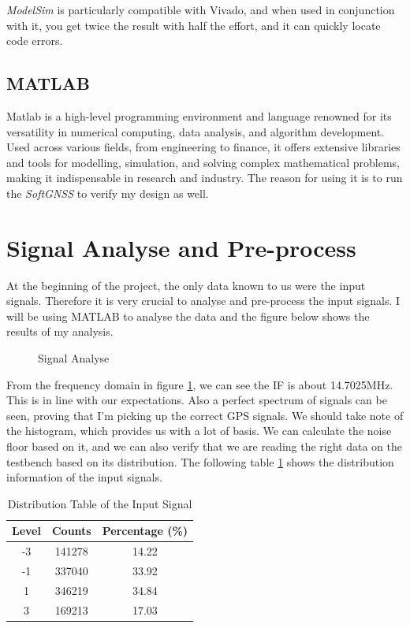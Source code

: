 \textit{ModelSim} is particularly compatible with Vivado, and when used in conjunction with it, you get twice the result with half the effort, and it can quickly locate code errors.

\subsection{MATLAB}
Matlab is a high-level programming environment and language renowned for its versatility in numerical computing, data analysis, and algorithm development. Used across various fields, from engineering to finance, it offers extensive libraries and tools for modelling, simulation, and solving complex mathematical problems, making it indispensable in research and industry. The reason for using it is to run the \textit{SoftGNSS} to verify my design as well.

\section{Signal Analyse and Pre-process}
At the beginning of the project, the only data known to us were the input signals. Therefore it is very crucial to analyse and pre-process the input signals. I will be using MATLAB to analyse the data and the figure below shows the results of my analysis.

\begin{figure}[!htbp]
    \centering
    
    \caption{Signal Analyse}
    \label{fig:sig_info}
\end{figure}

From the frequency domain in figure \ref{fig:sig_info}, we can see the IF is about 14.7025MHz. This is in line with our expectations. Also a perfect spectrum of signals can be seen, proving that I'm picking up the correct GPS signals. We should take note of the histogram, which provides us with a lot of basis. We can calculate the noise floor based on it, and we can also verify that we are reading the right data on the testbench based on its distribution. The following table \ref{tab:dis_sig} shows the distribution information of the input signals.

\begin{table}[!htbp]
\centering
\renewcommand\arraystretch{1.5}
\caption{Distribution Table of the Input Signal}
\label{tab:dis_sig}
\begin{tabular}{ccc}
    \toprule
    Level & Counts & Percentage (\%) \\
    \midrule
    -3 & \num{141278} & 14.22 \\
    -1 & \num{337040} & 33.92 \\
    1 & \num{346219} & 34.84 \\
    3 & \num{169213} & 17.03 \\
    \bottomrule
\end{tabular}
\end{table}

